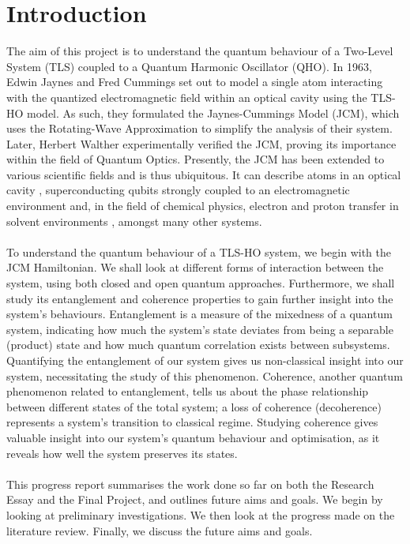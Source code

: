 \documentclass[12pt,a4paper]{article}
\begin{document}
\section{Introduction}
The aim of this project is to understand the quantum behaviour of a Two-Level System (TLS) coupled to a Quantum Harmonic Oscillator (QHO). In 1963, Edwin Jaynes and Fred Cummings set out to model a single atom interacting with the quantized electromagnetic field within an optical cavity\cite{C_JC_1963} using the TLS-HO model. As such, they formulated the Jaynes-Cummings Model (JCM), which uses the Rotating-Wave Approximation to simplify the analysis of their system. Later, Herbert Walther experimentally verified\cite{C_JC_verification} the JCM, proving its importance within the field of Quantum Optics. Presently, the JCM has been extended to various scientific fields and is thus ubiquitous. It can describe atoms in an optical cavity \cite{H_JC_friction}, superconducting qubits strongly coupled to an electromagnetic environment\cite{C_superconducting_qubit} and, in the field of chemical physics, electron and proton transfer in solvent environments \cite{C_superconducting_qubit}, amongst many other systems.\\
\\
To understand the quantum behaviour of a TLS-HO system, we begin with the JCM Hamiltonian. We shall look at different forms of interaction between the system, using both closed and open quantum approaches. Furthermore, we shall study its entanglement and coherence properties to gain further insight into the system's behaviours. Entanglement is a measure of the mixedness of a quantum system, indicating how much the system's state deviates from being a separable (product) state\cite{E_WC_Definition} and how much quantum correlation exists between subsystems. Quantifying the entanglement of our system gives us non-classical insight into our system, necessitating the study of this phenomenon. Coherence\cite{C_colloquium}, another quantum phenomenon related to entanglement, tells us about the phase relationship between different states of the total system; a loss of coherence (decoherence) represents a system's transition to classical regime. Studying coherence gives valuable insight into our system's quantum behaviour and optimisation, as it reveals how well the system preserves its states.\\
\\
This progress report summarises the work done so far on both the Research Essay and the Final Project, and outlines future aims and goals. We begin by looking at preliminary investigations. We then look at the progress made on the literature review. Finally, we discuss the future aims and goals.
\end{document}
